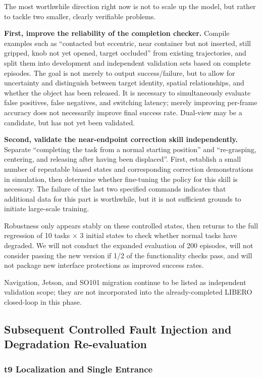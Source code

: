 The most worthwhile direction right now is not to scale up the model, but rather to tackle two smaller, clearly verifiable problems.

\textbf{First, improve the reliability of the completion checker.} Compile examples such as ``contacted but eccentric, near container but not inserted, still gripped, knob not yet opened, target occluded'' from existing trajectories, and split them into development and independent validation sets based on complete episodes. The goal is not merely to output success/failure, but to allow for uncertainty and distinguish between target identity, spatial relationships, and whether the object has been released. It is necessary to simultaneously evaluate false positives, false negatives, and switching latency; merely improving per-frame accuracy does not necessarily improve final success rate. Dual-view may be a candidate, but has not yet been validated.

\textbf{Second, validate the near-endpoint correction skill independently.} Separate ``completing the task from a normal starting position'' and ``re-grasping, centering, and releasing after having been displaced''. First, establish a small number of repeatable biased states and corresponding correction demonstrations in simulation, then determine whether fine-tuning the policy for this skill is necessary. The failure of the last two specified commands indicates that additional data for this part is worthwhile, but it is not sufficient grounds to initiate large-scale training.

Robustness only appears stably on these controlled states, then returns to the full regression of 10 tasks \(\times\) 3 initial states to check whether normal tasks have degraded. We will not conduct the expanded evaluation of 200 episodes, will not consider passing the new version if 1/2 of the functionality checks pass, and will not package new interface protections as improved success rates.

Navigation, Jetson, and SO101 migration continue to be listed as independent validation scope; they are not incorporated into the already-completed LIBERO closed-loop in this phase.


\subsection{Subsequent Controlled Fault Injection and Degradation Re-evaluation}\label{s10-detail-14}

\subsubsection{t9 Localization and Single Entrance}\label{s10-detail-15}

